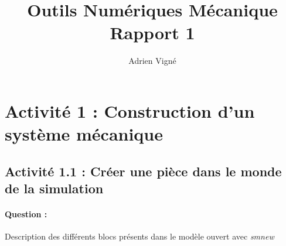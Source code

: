 \documentclass[12pt,a4paper]{article}
\author{Adrien Vigné}
\title{Outils Numériques Mécanique Rapport 1}
\begin{document}
\maketitle
\newpage
\tableofcontents
\newpage
\section{Activité 1 : Construction d'un système mécanique }
\subsection{Activité 1.1 : Créer une pièce dans le monde de la simulation}

\paragraph{Question :}
Description des différents blocs présents dans le modèle ouvert avec \textit{smnew}
\end{document}
